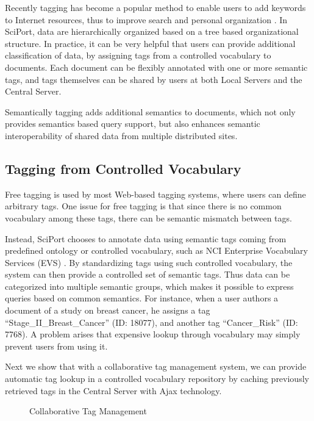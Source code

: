 \documentclass{singlecol-new}
\theoremstyle{TH}{
\newtheorem{lemma}{Lemma}
\newtheorem{theorem}[lemma]{Theorem}
\newtheorem{corrolary}[lemma]{Corrolary}
\newtheorem{conjecture}[lemma]{Conjecture}
\newtheorem{proposition}[lemma]{Proposition}
\newtheorem{claim}[lemma]{Claim}
\newtheorem{stheorem}[lemma]{Wrong Theorem}
\newtheorem{algorithm}{Algorithm}
}
\theoremstyle{THrm}{
\newtheorem{definition}{Definition}[section]
\newtheorem{question}{Question}[section]
\newtheorem{remark}{Remark}
\newtheorem{scheme}{Scheme}
}
\theoremstyle{THhit}{
\newtheorem{case}{Case}[section]
}
\begin{document}
Recently tagging has become a popular method to enable users to add
keywords to Internet resources, thus to improve search and personal
organization \cite{marlow06tag}. In SciPort, data are hierarchically
organized based on a tree based organizational structure. In
practice, it can be very helpful that users can provide additional
classification of data, by assigning tags from a controlled
vocabulary to documents. Each document can be flexibly annotated
with one or more semantic tags, and tags themselves can be shared by
users at both Local Servers and the Central Server.

Semantically tagging adds additional semantics to documents, which
not only provides semantics based query support, but also enhances
semantic interoperability of shared data from multiple distributed
sites.


\subsection{Tagging from Controlled Vocabulary}

Free tagging is used by most Web-based tagging systems, where users
can define arbitrary tags. One issue for free tagging is that since
there is no common vocabulary among these tags, there can be
semantic mismatch between tags.

Instead, SciPort chooses to annotate data using semantic tags coming
from predefined ontology or controlled vocabulary, such as NCI
Enterprise Vocabulary Services (EVS) \cite{ncievs}. By standardizing
tags using such controlled vocabulary, the system can then provide a
controlled  set of semantic tags. Thus data can be categorized into
multiple semantic groups, which makes it possible to express queries
based on common semantics. For instance, when a user authors a
document of a study on breast cancer,  he assigns  a tag
``Stage\_II\_Breast\_Cancer'' (ID: 18077), and another tag
``Cancer\_Risk'' (ID: 7768). A problem arises that expensive lookup
through vocabulary may simply prevent users from using it.

Next we show that with a collaborative tag management system, we can
provide automatic tag lookup in a controlled vocabulary repository
by caching previously retrieved tags in the Central Server with Ajax
technology.

\begin{figure*}[t] \center%
\caption{Collaborative Tag Management} \label{collaborativeTags}
\end{figure*}
\end{document}
